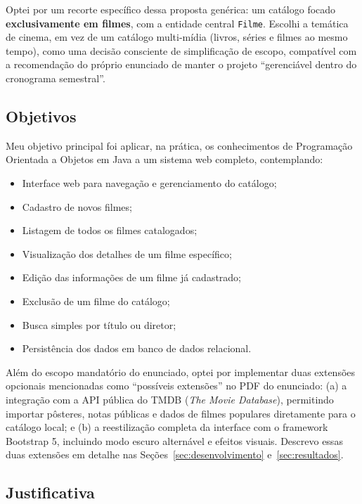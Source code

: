 \documentclass[12pt,a4paper]{article}
\begin{document}
Optei por um recorte específico dessa proposta genérica: um catálogo focado
\textbf{exclusivamente em filmes}, com a entidade central \texttt{Filme}. Escolhi a temática de
cinema, em vez de um catálogo multi-mídia (livros, séries e filmes ao mesmo tempo), como uma
decisão consciente de simplificação de escopo, compatível com a recomendação do próprio
enunciado de manter o projeto ``gerenciável dentro do cronograma semestral''.

\subsection{Objetivos}

Meu objetivo principal foi aplicar, na prática, os conhecimentos de Programação Orientada a
Objetos em Java a um sistema web completo, contemplando:

\begin{itemize}
    \item Interface web para navegação e gerenciamento do catálogo;
    \item Cadastro de novos filmes;
    \item Listagem de todos os filmes catalogados;
    \item Visualização dos detalhes de um filme específico;
    \item Edição das informações de um filme já cadastrado;
    \item Exclusão de um filme do catálogo;
    \item Busca simples por título ou diretor;
    \item Persistência dos dados em banco de dados relacional.
\end{itemize}

Além do escopo mandatório do enunciado, optei por implementar duas extensões opcionais
mencionadas como ``possíveis extensões'' no PDF do enunciado: (a) a integração com a API pública
do TMDB (\textit{The Movie Database}), permitindo importar pôsteres, notas públicas e dados de
filmes populares diretamente para o catálogo local; e (b) a reestilização completa da interface
com o framework Bootstrap 5, incluindo modo escuro alternável e efeitos visuais. Descrevo essas
duas extensões em detalhe nas Seções~\ref{sec:desenvolvimento} e~\ref{sec:resultados}.

\subsection{Justificativa}
\end{document}
